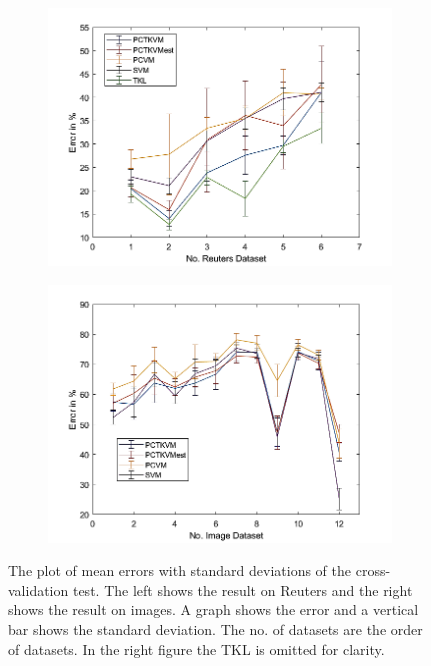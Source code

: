 \begin{figure}
	\centering
	\begin{subfigure}{.5\textwidth}
		\centering
		\includegraphics[width=1\linewidth]{figures/PerformanceReuters.png}
		\caption{\label{FigErrorReu}}
	\end{subfigure}%
	\begin{subfigure}{.5\textwidth}
		\centering
		\includegraphics[width=1\linewidth]{figures/PerformanceImage.png}
		\caption{\label{FigErrorImg}}
	\end{subfigure}
	\caption[Plot of mean Error and standard Deviation]{The plot of mean errors with standard deviations of the cross-validation test. The left shows the result on Reuters and the right shows the result on images. A graph shows the error and a vertical bar shows the standard deviation. The no. of datasets are the order of datasets. In the right figure the \acs{TKL} is omitted for clarity.\label{FigErrorDatasets}}
\end{figure}
